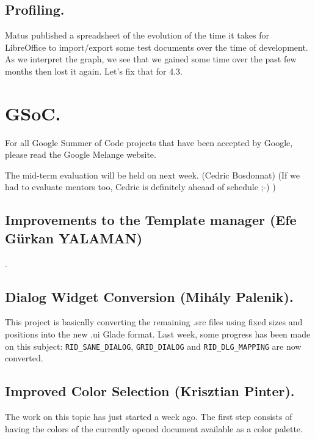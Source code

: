 \documentclass{article}
\begin{document}
\subsection{Profiling.}

Matus published a spreadsheet of the evolution of the time it takes for LibreOffice to import/export some test documents over the time of development. As we interpret the graph, we see that we gained some time over the past few months then lost it again. Let's fix that for 4.3.\cite{profiling} 



\section{GSoC.}

For all Google Summer of Code projects that have been accepted by Google, please read the Google Melange website\cite{gsocLink}.

The mid-term evaluation will be held on next week. (Cedric Bosdonnat)
(If we had to evaluate mentors too, Cedric is definitely aheaad of schedule ;-) \cite{gsocMidTermEval})

\subsection{Improvements to the Template manager (Efe Gürkan YALAMAN)}

\cite{gsocTemplateManager}.

\subsection{Dialog Widget Conversion (Mihály Palenik).}

This project is basically converting the remaining .src files using fixed sizes and positions into the new .ui Glade format. Last week, some progress has been made on this subject: \lstinline|RID_SANE_DIALOG|, \lstinline|GRID_DIALOG| and \lstinline|RID_DLG_MAPPING| are now converted\cite{gsocDialogWidgetWeek4}.

\subsection{Improved Color Selection (Krisztian Pinter).}

The work on this topic has just started a week ago. The first step consists of having the colors of the currently opened document available as a color palette.
\end{document}
